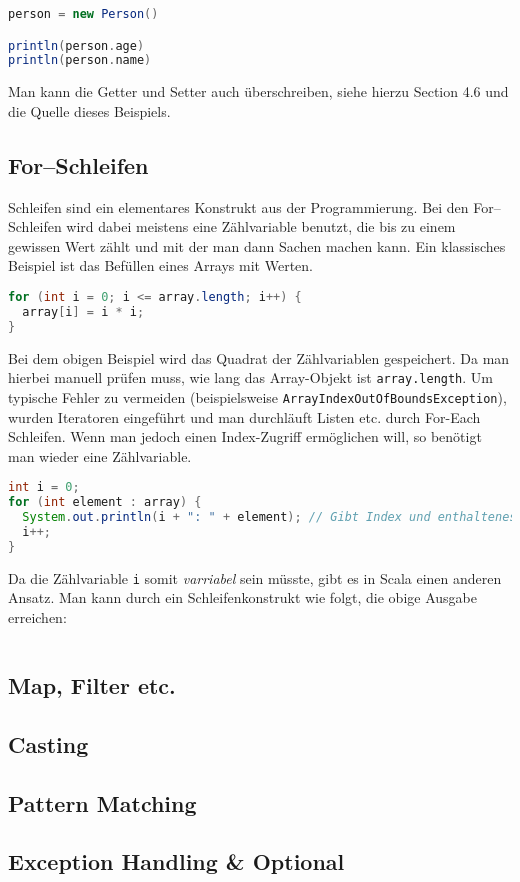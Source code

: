 \begin{lstlisting}[language=Scala]
person = new Person()

println(person.age)
println(person.name)
\end{lstlisting}

Man kann die Getter und Setter auch überschreiben, siehe hierzu \cite{ScalaCookbook} Section 4.6 und die Quelle dieses Beispiels.

\subsection{For--Schleifen}

Schleifen sind ein elementares Konstrukt aus der Programmierung. Bei den For--Schleifen wird dabei meistens eine Zählvariable benutzt, die bis zu einem gewissen Wert zählt und mit der man dann Sachen machen kann. Ein klassisches Beispiel ist das Befüllen eines Arrays mit Werten.

\begin{lstlisting}[language=Java,caption=Typische For--Schleife aus der Java Programmierung]
for (int i = 0; i <= array.length; i++) {
  array[i] = i * i;
}
\end{lstlisting}

Bei dem obigen Beispiel wird das Quadrat der Zählvariablen gespeichert. Da man hierbei manuell prüfen muss, wie lang das Array-Objekt ist \texttt{array.length}. Um typische Fehler zu vermeiden (beispielsweise \texttt{ArrayIndexOutOfBoundsException}), wurden Iteratoren eingeführt und man durchläuft Listen etc. durch For-Each Schleifen. Wenn man jedoch einen Index-Zugriff ermöglichen will, so benötigt man wieder eine Zählvariable.

\begin{lstlisting}[language=Java]
int i = 0;
for (int element : array) {
  System.out.println(i + ": " + element); // Gibt Index und enthaltenes Element aus
  i++;
}
\end{lstlisting}

Da die Zählvariable \texttt{i} somit \textit{varriabel} sein müsste, gibt es in Scala einen anderen Ansatz. Man kann durch ein Schleifenkonstrukt wie folgt, die obige Ausgabe erreichen:

\begin{lstlisting}[language=Scala]

\end{lstlisting}



\subsection{Map, Filter etc.}
\subsection{Casting}
\subsection{Pattern Matching}
\subsection{Exception Handling \& Optional}
